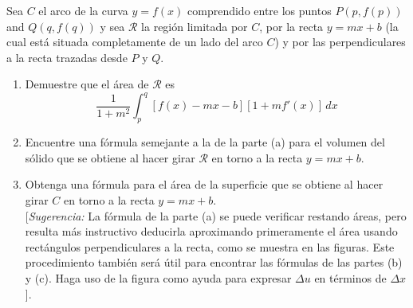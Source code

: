 \item Sea $C$ el arco de la curva $y = f(x)$ comprendido entre los puntos $P(p, f(p))$ and $Q(q, f(q))$ y sea $\mathscr{R}$ la región limitada por $C$, por la recta $y = mx + b$ (la cual está situada completamente de un lado del arco $C$) y por las perpendiculares a la recta trazadas desde $P$ y $Q$.
    \begin{enumerate}
        \item[(a)] Demuestre que el área de $\mathscr{R}$ es
        \[ \frac{1}{1 + m^2} \int_p^q [f(x) - mx - b][1 + m f'(x)] \, dx \]
        \item[(b)] Encuentre una fórmula semejante a la de la parte (a) para el volumen del sólido que se obtiene al hacer girar $\mathscr{R}$ en torno a la recta $y = mx + b$.
        \item[(c)] Obtenga una fórmula para el área de la superficie que se obtiene al hacer girar $C$ en torno a la recta $y = mx + b$. \\
        {[}\textit{Sugerencia:} La fórmula de la parte (a) se puede verificar restando áreas, pero resulta más instructivo deducirla aproximando primeramente el área usando rectángulos perpendiculares a la recta, como se muestra en las figuras. Este procedimiento también será útil para encontrar las fórmulas de las partes (b) y (c). Haga uso de la figura como ayuda para expresar $\Delta u$ en términos de $\Delta x${]}.
    \end{enumerate}
    
    \begin{center}
    \end{center}
